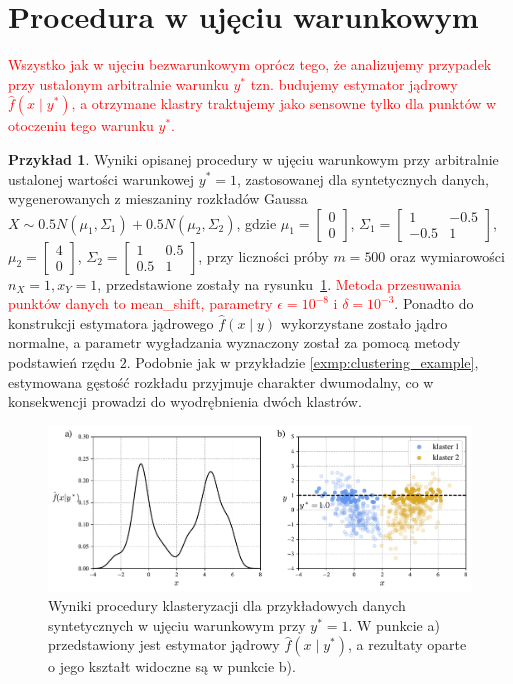 \documentclass[12pt,a4paper,oneside]{book}
\theoremstyle{definition}
\newtheorem{exmp}{Przykład}[chapter]
\begin{document}
\section{Procedura w ujęciu warunkowym}

\textcolor{red}{Wszystko jak w ujęciu bezwarunkowym oprócz tego, że analizujemy przypadek przy ustalonym arbitralnie warunku $y^*$ tzn. budujemy estymator jądrowy $\hat{f}(x \mid y^*)$, a otrzymane klastry traktujemy jako sensowne tylko dla punktów w otoczeniu tego warunku $y^*$.}
\begin{exmp}
Wyniki opisanej procedury w ujęciu warunkowym przy arbitralnie ustalonej wartości warunkowej $y^*=1$, zastosowanej dla syntetycznych danych, wygenerowanych z mieszaniny rozkładów Gaussa $X \sim 0.5 N(\mu_1,\Sigma_1) + 0.5 N(\mu_2,\Sigma_2)$, gdzie $\mu_1=\begin{bmatrix} 0 \\ 0 \end{bmatrix}$, $\Sigma_1=\begin{bmatrix} 1 & -0.5 \\ -0.5 & 1 \end{bmatrix}$, $\mu_2=\begin{bmatrix} 4 \\ 0 \end{bmatrix}$, $\Sigma_2=\begin{bmatrix} 1 & 0.5 \\ 0.5 & 1 \end{bmatrix}$, przy liczności próby $m=500$ oraz wymiarowości $n_X=1, x_Y=1$, przedstawione zostały na rysunku~\ref{fig:clustering_example2}. \textcolor{red}{Metoda przesuwania punktów danych to mean\_shift, parametry $\epsilon = 10^{-8}$ i $\delta = 10^{-3}$}. Ponadto do konstrukcji estymatora jądrowego $\hat{f}(x \mid y)$ wykorzystane zostało jądro normalne, a parametr wygładzania wyznaczony został za pomocą metody podstawień rzędu $2$. Podobnie jak w przykładzie \ref{exmp:clustering_example}, estymowana gęstość rozkładu przyjmuje charakter dwumodalny, co w konsekwencji prowadzi do wyodrębnienia dwóch klastrów.
\begin{figure}[H]
    \centering
    \includegraphics[scale=0.6]{clustering_example2}
    \vspace{-0.5cm} 
    \caption{Wyniki procedury klasteryzacji dla przykładowych danych syntetycznych w ujęciu warunkowym przy $y^*=1$. W punkcie a) przedstawiony jest estymator jądrowy $\hat{f}(x \mid y^*)$, a rezultaty oparte o jego kształt widoczne są w punkcie b).}
    \label{fig:clustering_example2}
\end{figure}
\end{exmp}
\end{document}
